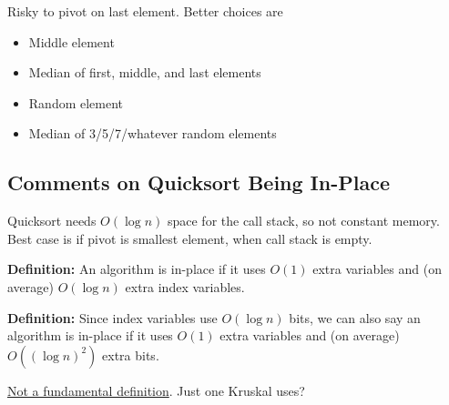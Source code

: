 Risky to pivot on last element. Better choices are
\begin{itemize}
    \item Middle element
    \item Median of first, middle, and last elements
    \item Random element
    \item Median of 3/5/7/whatever random elements
\end{itemize}

\subsection*{Comments on Quicksort Being In-Place}

Quicksort needs $O(\log n)$ space for the call stack, so not constant memory. Best case is if pivot is smallest element, when call stack is empty.

\textbf{Definition:} An algorithm is in-place if it uses $O(1)$ extra variables and (on average) $O(\log n)$ extra index variables.

\textbf{Definition:} Since index variables use $O(\log n)$ bits, we can also say an algorithm is in-place if it uses $O(1)$ extra variables and (on average) $O((\log n)^2)$ extra bits.

\underline{Not a fundamental definition}. Just one Kruskal uses?
